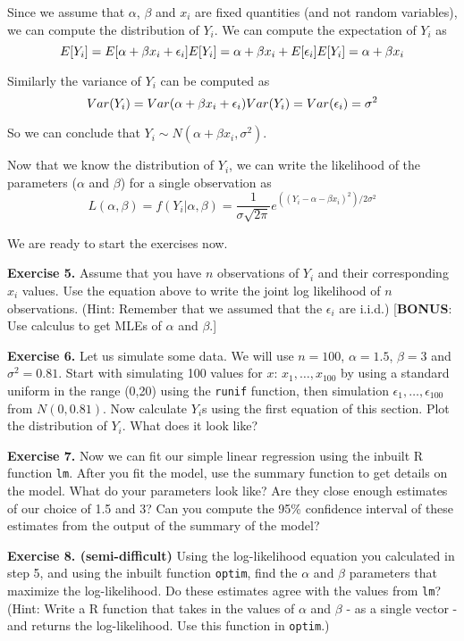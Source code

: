 \documentclass[
]{book}
\begin{document}
Since we assume that \(\alpha\), \(\beta\) and \(x_i\) are fixed quantities (and not random variables), we can compute the distribution of \(Y_i\). We can compute the expectation of \(Y_i\) as \[E[Y_i] = E[\alpha+\beta x_i + \epsilon_i] \\ E[Y_i] = \alpha + \beta x_i + E[\epsilon_i]\\E[Y_i] = \alpha + \beta x_i\]

Similarly the variance of \(Y_i\) can be computed as \[Var(Y_i) = Var(\alpha+\beta x_i + \epsilon_i)\\Var(Y_i) = Var(\epsilon_i) = \sigma^2\]

So we can conclude that \(Y_i \sim N(\alpha+\beta x_i, \sigma^2)\).

Now that we know the distribution of \(Y_i\), we can write the likelihood of the parameters (\(\alpha\) and \(\beta\)) for a single observation as \[L(\alpha, \beta) = f(Y_i | \alpha, \beta) = \frac{1}{\sigma \sqrt{2\pi}}e^{((Y_i - \alpha - \beta x_i)^2)/2\sigma^2}\]

We are ready to start the exercises now.

\textbf{Exercise 5.} Assume that you have \(n\) observations of \(Y_i\) and their corresponding \(x_i\) values. Use the equation above to write the joint log likelihood of \(n\) observations. (Hint: Remember that we assumed that the \(\epsilon_i\) are i.i.d.) {[}\textbf{BONUS}: Use calculus to get MLEs of \(\alpha\) and \(\beta\).{]}

\textbf{Exercise 6.} Let us simulate some data. We will use \(n=100\), \(\alpha=1.5\), \(\beta=3\) and \(\sigma^2=0.81\). Start with simulating 100 values for \(x\): \(x_1,\dots,x_{100}\) by using a standard uniform in the range (0,20) using the \texttt{runif} function, then simulation \(\epsilon_1, \dots,\epsilon_{100}\) from \(N(0, 0.81)\). Now calculate \(Y_i\)s using the first equation of this section. Plot the distribution of \(Y_i\). What does it look like?

\textbf{Exercise 7.} Now we can fit our simple linear regression using the inbuilt R function \texttt{lm}. After you fit the model, use the summary function to get details on the model. What do your parameters look like? Are they close enough estimates of our choice of 1.5 and 3? Can you compute the 95\% confidence interval of these estimates from the output of the summary of the model?

\textbf{Exercise 8. (semi-difficult)} Using the log-likelihood equation you calculated in step 5, and using the inbuilt function \texttt{optim}, find the \(\alpha\) and \(\beta\) parameters that maximize the log-likelihood. Do these estimates agree with the values from \texttt{lm}? (Hint: Write a R function that takes in the values of \(\alpha\) and \(\beta\) - as a single vector - and returns the log-likelihood. Use this function in \texttt{optim}.)
\end{document}
